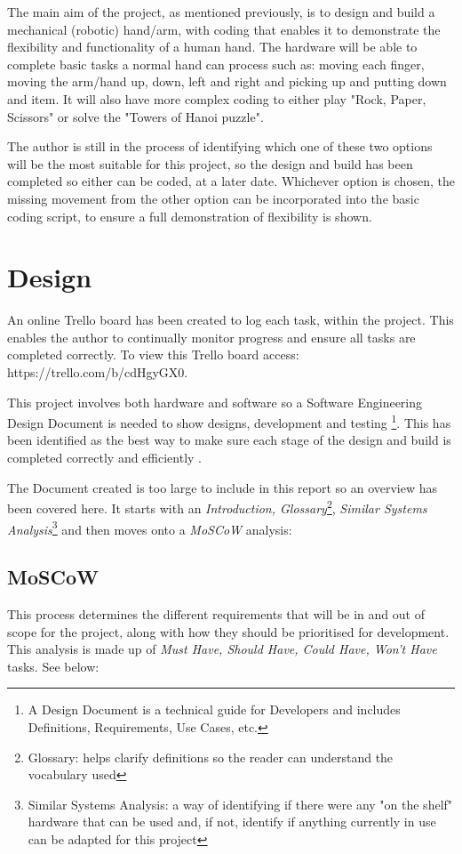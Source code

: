\documentclass[progress]{cmpreport}
\begin{document}
The main aim of the project, as mentioned previously, is to design and build a mechanical (robotic) hand/arm, with coding that enables it to demonstrate the flexibility and functionality of a human hand. The hardware will be able to complete basic tasks a normal hand can process such as: moving each finger, moving the arm/hand up, down, left and right and picking up and putting down and item. It will also have more complex coding to either play "Rock, Paper, Scissors" or solve the "Towers of Hanoi puzzle". 

The author is still in the process of identifying which one of these two options will be the most suitable for this project, so the design and build has been completed so either can be coded, at a later date. Whichever option is chosen, the missing movement from the other option can be incorporated into the basic coding script, to ensure a full demonstration of flexibility is shown. 

\section{Design}
An online Trello board has been created to log each task, within the project. This enables the author to continually monitor progress and ensure all tasks are completed correctly. To view this Trello board access: https://trello.com/b/cdHgyGX0.

This project involves both hardware and software so a Software Engineering Design Document is needed to show designs, development and testing \footnote{A Design Document is a technical guide for Developers and includes Definitions, Requirements, Use Cases, etc.}. This has been identified as the best way to make sure each stage of the design and build is completed correctly and efficiently \citep{mcelrath}.

The Document created is too large to include in this report so an overview has been covered here. It starts with an \textit{Introduction, Glossary}\footnote{Glossary: helps clarify definitions so the reader can understand the vocabulary used}, \textit{Similar Systems Analysis}\footnote{Similar Systems Analysis: a way of identifying if there were any "on the shelf" hardware that can be used and, if not, identify if anything currently in use can be adapted for this project} and then moves onto a \textit{MoSCoW} analysis:

\subsection{MoSCoW}
This process determines the different requirements that will be in and out of scope for the project, along with how they should be prioritised for development. This analysis is made up of \textit{Must Have, Should Have, Could Have, Won't Have} tasks. See below: \newline
\end{document}
